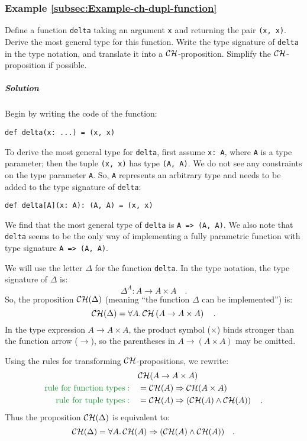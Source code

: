 \subsubsection{Example \label{subsec:Example-ch-dupl-function}\ref{subsec:Example-ch-dupl-function}}

Define a function \lstinline!delta! taking an argument \lstinline!x!
and returning the pair \lstinline!(x, x)!. Derive the most general
type for this function. Write the type signature of \lstinline!delta!
in the type notation, and translate it into a ${\cal CH}$-proposition.
Simplify the ${\cal CH}$-proposition if possible.

\subparagraph{Solution}

Begin by writing the code of the function:
\begin{lstlisting}
def delta(x: ...) = (x, x)
\end{lstlisting}
To derive the most general type for \lstinline!delta!, first assume
\lstinline!x: A!, where \lstinline!A! is a type parameter; then
the tuple \lstinline!(x, x)! has type \lstinline!(A, A)!. We do
not see any constraints on the type parameter \lstinline!A!. So,
\lstinline!A! represents an arbitrary type and needs to be added
to the type signature of \lstinline!delta!:
\begin{lstlisting}
def delta[A](x: A): (A, A) = (x, x)
\end{lstlisting}
We find that the most general type of \lstinline!delta! is \lstinline!A => (A, A)!.
We also note that \lstinline!delta! seems to be the only way of implementing
a fully parametric function with type signature \lstinline!A => (A, A)!.

We will use the letter $\Delta$ for the function \lstinline!delta!.
In the type notation, the type signature of $\Delta$ is:
\[
\Delta^{A}:A\rightarrow A\times A\quad.
\]
So, the proposition ${\cal CH}(\Delta)$ (meaning \textsf{``}the function
$\Delta$ can be implemented\textsf{''}) is:
\[
{\cal CH}(\Delta)=\forall A.{\cal \,CH}\left(A\rightarrow A\times A\right)\quad.
\]
In the type expression $A\rightarrow A\times A$, the product symbol
($\times$) binds stronger than the function arrow ($\rightarrow$),
so the parentheses in $A\rightarrow\left(A\times A\right)$ may be
omitted.

Using the rules for transforming ${\cal CH}$-propositions, we rewrite:
\begin{align*}
 & {\cal CH}(A\rightarrow A\times A)\\
{\color{greenunder}\text{rule for function types}:}\quad & ={\cal CH}(A)\Rightarrow{\cal CH}(A\times A)\\
{\color{greenunder}\text{rule for tuple types}:}\quad & ={\cal CH}(A)\Rightarrow\left({\cal CH}(A)\wedge{\cal CH}(A)\right)\quad.
\end{align*}
Thus the proposition ${\cal CH}(\Delta)$ is equivalent to:
\[
{\cal CH}(\Delta)=\forall A.\,{\cal CH}(A)\Rightarrow({\cal CH}(A)\wedge{\cal CH}(A))\quad.
\]

